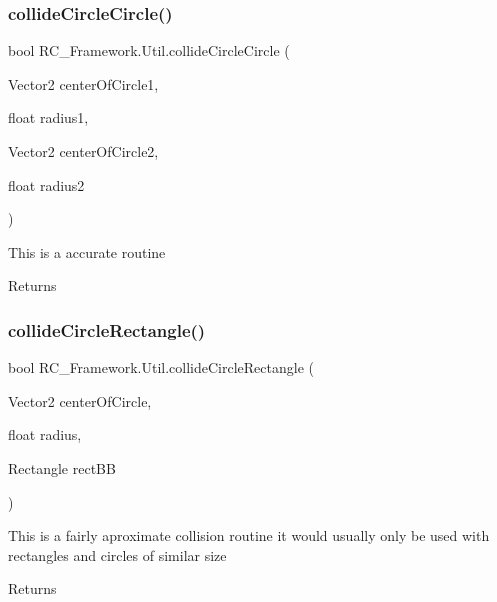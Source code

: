 \subsubsection{\texorpdfstring{collide\+Circle\+Circle()}{collideCircleCircle()}}
{\footnotesize\ttfamily bool R\+C\+\_\+\+Framework.\+Util.\+collide\+Circle\+Circle (\begin{DoxyParamCaption}\item[{Vector2}]{center\+Of\+Circle1,  }\item[{float}]{radius1,  }\item[{Vector2}]{center\+Of\+Circle2,  }\item[{float}]{radius2 }\end{DoxyParamCaption})}



This is a accurate routine 

\begin{DoxyReturn}{Returns}

\end{DoxyReturn}
\mbox{\label{class_r_c___framework_1_1_util_a775e3f63e6491a8ea6bd6a1a82db5531}} 
\subsubsection{\texorpdfstring{collide\+Circle\+Rectangle()}{collideCircleRectangle()}}
{\footnotesize\ttfamily bool R\+C\+\_\+\+Framework.\+Util.\+collide\+Circle\+Rectangle (\begin{DoxyParamCaption}\item[{Vector2}]{center\+Of\+Circle,  }\item[{float}]{radius,  }\item[{Rectangle}]{rect\+BB }\end{DoxyParamCaption})}



This is a fairly aproximate collision routine it would usually only be used with rectangles and circles of similar size 

\begin{DoxyReturn}{Returns}

\end{DoxyReturn}
\mbox{\label{class_r_c___framework_1_1_util_ae49f540d59a1b7169b659a8cd45cffd4}} 
